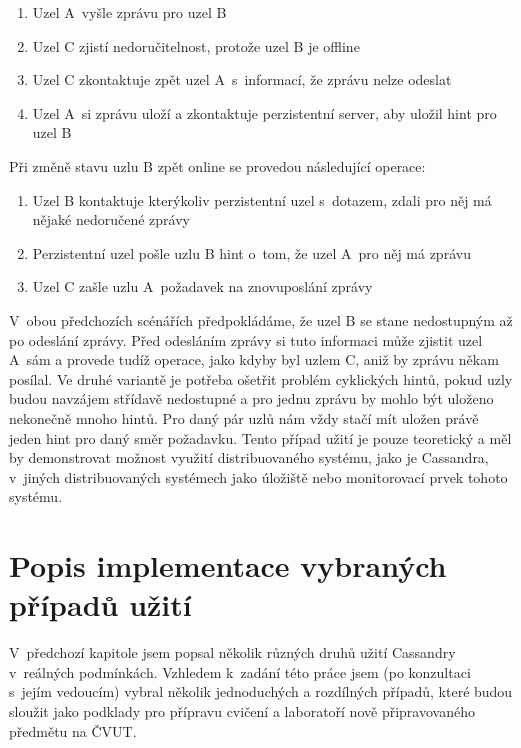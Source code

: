 \begin{enumerate}
\item Uzel A~vyšle zprávu pro uzel B
\item Uzel C zjistí nedoručitelnost, protože uzel B je offline
\item Uzel C zkontaktuje zpět uzel A~s~informací, že zprávu nelze odeslat
\item Uzel A~si zprávu uloží a zkontaktuje perzistentní server, aby uložil hint pro uzel B

\end{enumerate}

Při změně stavu uzlu B zpět online se provedou následující operace:

\begin{enumerate}
\item Uzel B kontaktuje kterýkoliv perzistentní uzel s~dotazem, zdali pro něj má nějaké nedoručené zprávy
\item Perzistentní uzel pošle uzlu B hint o~tom, že uzel A~pro něj má zprávu
\item Uzel C zašle uzlu A~požadavek na znovuposlání zprávy
\end{enumerate}


V~obou předchozích scénářích předpokládáme, že uzel B se stane nedostupným až po odeslání zprávy. Před odesláním zprávy si tuto informaci může zjistit uzel A~sám a provede tudíž operace, jako kdyby byl uzlem C, aniž by zprávu někam posílal. Ve druhé variantě je potřeba ošetřit problém cyklických hintů, pokud uzly budou navzájem střídavě nedostupné a pro jednu zprávu by mohlo být uloženo nekonečně mnoho hintů. Pro daný pár uzlů nám vždy stačí mít uložen právě jeden hint pro daný směr požadavku. Tento případ užití je pouze teoretický a měl by demonstrovat možnost využití distribuovaného systému, jako je Cassandra, v~jiných distribuovaných systémech jako úložiště nebo monitorovací prvek tohoto systému. 


\chapter{Popis implementace vybraných případů užití}
V~předchozí kapitole jsem popsal několik různých druhů užití Cassandry v~reálných podmínkách. Vzhledem k~zadání této práce jsem (po konzultaci s~jejím vedoucím) vybral několik jednoduchých a rozdílných případů, které budou sloužit jako podklady pro přípravu cvičení a laboratoří nově připravovaného předmětu na ČVUT.

